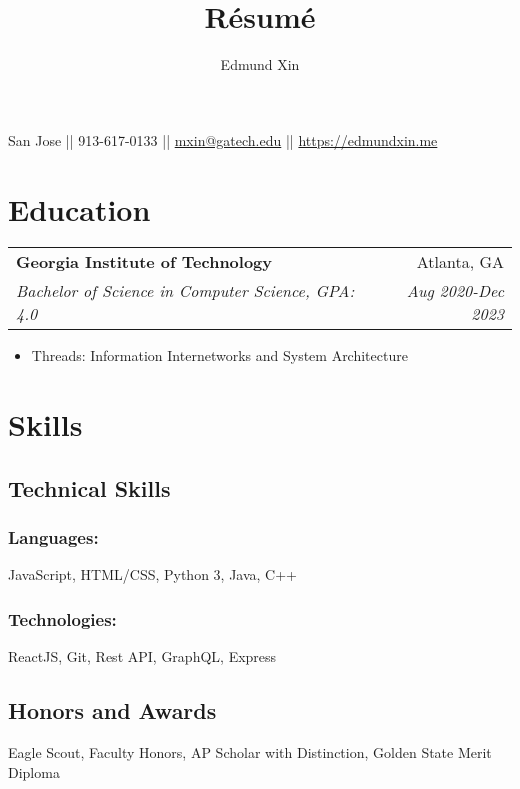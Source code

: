 \documentclass[letterpaper,8pt]{article}
\makeatletter
\renewcommand{\maketitle}{
  \begin{center}
  {\huge\bfseries
  \theauthor}

  \vspace{0.25em}

  San Jose || 913-617-0133 || \href{mailto:mxin@gatech.edu}{mxin@gatech.edu} || \href{https://edmundxin.me}{https://edmundxin.me}

  \end{center}
}
\newcommand{\resumeSubheading}[4]{
  \vspace{0.25em}
  \begin{tabular*}{1\textwidth}[t]{l@{\extracolsep{\fill}}r}
    \textbf{#1} & #2 \\
    \textit{#3} & \textit{#4} \\
  \end{tabular*}\vspace{-5pt}
}
\makeatother
\begin{document}
\title{R\'esum\'e}
\author{Edmund Xin}

\maketitle

\section{Education}

\resumeSubheading{Georgia Institute of Technology}
{Atlanta, GA}{Bachelor of Science in Computer Science, GPA: 4.0
}{Aug 2020-Dec 2023}

\begin{itemize}
  \item Threads: Information Internetworks and System Architecture
\end{itemize}

\section{Skills}

\begin{multicols}{2}
\subsection{Technical Skills}

\subsubsection{Languages:}

JavaScript, HTML/CSS, Python 3, Java, C++

\subsubsection{Technologies:}

ReactJS, Git, Rest API, GraphQL, Express

\columnbreak


\subsection{Honors and Awards}
Eagle Scout, Faculty Honors, AP Scholar with Distinction, Golden State Merit Diploma

\end{multicols}

\vspace{3pt}
\end{document}

